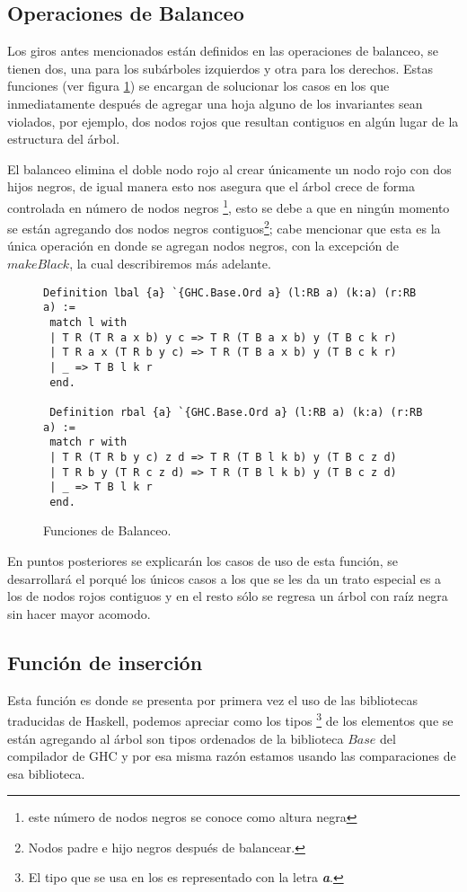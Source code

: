 \subsection{Operaciones de Balanceo}
Los giros antes mencionados están definidos en las operaciones de balanceo, se tienen dos, una para
los subárboles izquierdos y otra para los derechos. Estas funciones (ver figura \ref{func_balanceo})
se encargan de solucionar los casos en los que inmediatamente después de agregar una hoja alguno de 
los invariantes sean violados, por ejemplo, dos nodos rojos que resultan contiguos en algún lugar 
de la estructura del \'arbol.

El balanceo elimina el doble nodo rojo al crear \'unicamente un nodo rojo con dos hijos negros, de 
igual manera esto nos asegura que el árbol crece de forma controlada en n\'umero de nodos negros
\footnote{este n\'umero de nodos negros se conoce como altura negra}, esto se debe a que en ningún
momento se están agregando dos nodos negros contiguos\footnote{Nodos padre e hijo negros después de
balancear.}; cabe mencionar que esta es la única operación en donde se agregan nodos negros, con la
excepción de $makeBlack$, la cual describiremos m\'as adelante.

\begin{figure}
\centering
\captionsetup{justification=centering}
\begin{verbatim}
Definition lbal {a} `{GHC.Base.Ord a} (l:RB a) (k:a) (r:RB a) :=
 match l with
 | T R (T R a x b) y c => T R (T B a x b) y (T B c k r)
 | T R a x (T R b y c) => T R (T B a x b) y (T B c k r)
 | _ => T B l k r
 end.

 Definition rbal {a} `{GHC.Base.Ord a} (l:RB a) (k:a) (r:RB a) :=
 match r with
 | T R (T R b y c) z d => T R (T B l k b) y (T B c z d)
 | T R b y (T R c z d) => T R (T B l k b) y (T B c z d)
 | _ => T B l k r
 end.
\end{verbatim}
\caption{Funciones de Balanceo.}
\label{func_balanceo}
\end{figure}

En puntos posteriores se explicar\'an los casos de uso de esta función, se desarrollar\'a el 
porqu\'e los \'unicos casos a los que se les da un trato especial es a los de nodos rojos contiguos
y en el resto s\'olo se regresa un \'arbol con ra\'iz negra sin hacer mayor acomodo.

\subsection {Funci\'on de inserci\'on}
Esta funci\'on es donde se presenta por primera vez el uso de las bibliotecas traducidas de
Haskell, podemos apreciar como los tipos \footnote{El tipo que se usa en los \arns es representado 
con la letra \textbf{\textit{a}}.} de los elementos que se est\'an agregando al \'arbol son tipos
ordenados de la biblioteca $Base$ del compilador de GHC y por esa misma raz\'on estamos usando las
comparaciones de esa biblioteca.

